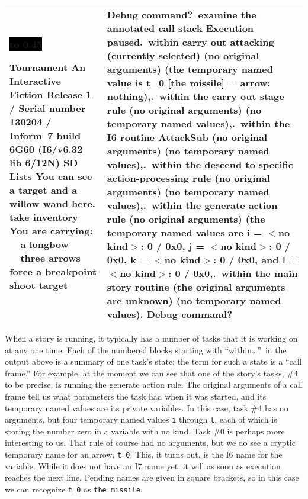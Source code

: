 \documentclass{book}
\newcommand{\n}{\hspace*{\fill}\newline}
\newcommand{\terp}[2]{\begin{center}\begin{tabular}{p{0.45\textwidth}|p{0.45\textwidth}}\midrule #1&#2\\\midrule\end{tabular}\end{center}}
\newcommand{\glkheading}[1]{\textbf{#1}}
\newcommand{\glkinput}[1]{\textbf{#1}}
\newcommand{\glkstatusline}[2]{\centerline{\colorbox{black}{\hbox to 0.45\textwidth{\textcolor{white}{#1\hfil #2}}}}}
\newcommand{\storyprompt}{\raisebox{1.5pt}{\(>\)}}
\newcommand{\cursor}{\raisebox{-1.5pt}{\RectangleThin}}
\begin{document}
\terp{\glkstatusline{Lists}{0/2}\n
  \glkheading{Tournament}\n
  An Interactive Fiction\n
  Release 1 / Serial number 130204 / Inform~7 build 6G60 (I6/v6.32 lib 6/12N) SD\n
  \n
  \glkheading{Lists}\n
  You can see a target and a willow wand here.\n
  \n
  \storyprompt\glkinput{take inventory}\n
  You are carrying:\n
  \null\ \ a longbow\n
  \null\ \ three arrows\n
  \n
  \storyprompt\glkinput{force a breakpoint}\n
  \storyprompt\glkinput{shoot target}}{%
  Debug command?\ \glkinput{examine the annotated call stack}\n
  \n
  Execution paused\n
  0.\ within carry out attacking (currently selected)\n
  \null\qquad (no original arguments)\n
  \null\qquad (the temporary named value is\n
  \null\qquad \qquad t\_0 [the missile] = arrow: nothing),\n
  1.\ within the carry out stage rule\n
  \null\qquad (no original arguments)\n
  \null\qquad (no temporary named values),\n
  2.\ within the I6 routine AttackSub\n
  \null\qquad (no original arguments)\n
  \null\qquad (no temporary named values),\n
  3.\ within the descend to specific action-processing rule\n
  \null\qquad (no original arguments)\n
  \null\qquad (no temporary named values),\n
  4.\ within the generate action rule\n
  \null\qquad (no original arguments)\n
  \null\qquad (the temporary named values are\n
  \null\qquad \qquad i = \(<\)no kind\(>\): 0 / 0x0,\n
  \null\qquad \qquad j = \(<\)no kind\(>\): 0 / 0x0,\n
  \null\qquad \qquad k = \(<\)no kind\(>\): 0 / 0x0, and\n
  \null\qquad \qquad l = \(<\)no kind\(>\): 0 / 0x0,\n
  5.\ within the main story routine\n
  \null\qquad (the original arguments are unknown)\n
  \null\qquad (no temporary named values).\n
  \n
  Debug command?\ \cursor}

When a story is running, it typically has a number of tasks that it is working
on at any one time.  Each of the numbered blocks starting with ``within\dots''\
in the output above is a summary of one task's state; the term for such a state
is a ``call frame.''  For example, at the moment we can see that one of the
story's tasks, \#4 to be precise, is running the generate action rule.  The
original arguments of a call frame tell us what parameters the task had when it
was started, and its temporary named values are its private variables.  In this
case, task \#4 has no arguments, but four temporary named values \lstinline{i}
through \lstinline{l}, each of which is storing the number zero in a variable
with no kind.  Task \#0 is perhaps more interesting to us.  That rule of course
had no arguments, but we do see a cryptic temporary name for an arrow,
\lstinline{t_0}.  This, it turns out, is the I6 name for the variable.  While it
does not have an I7 name yet, it will as soon as execution reaches the next
line.  Pending names are given in square brackets, so in this case we can
recognize \lstinline{t_0} as \lstinline{the missile}.
\end{document}
